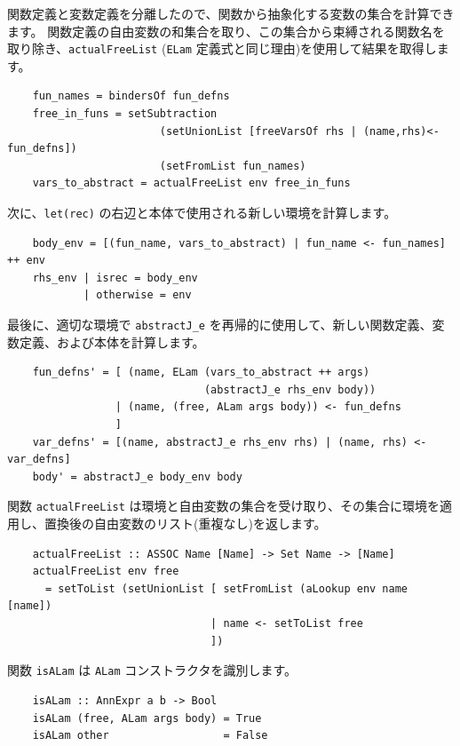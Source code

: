 \documentclass{jbook}
\begin{document}
関数定義と変数定義を分離したので、関数から抽象化する変数の集合を計算できます。
関数定義の自由変数の和集合を取り、この集合から束縛される関数名を取り除き、\texttt{actualFreeList} (\texttt{ELam} 定義式と同じ理由)を使用して結果を取得します。

\begin{verbatim}
	fun_names = bindersOf fun_defns
	free_in_funs = setSubtraction
	                    (setUnionList [freeVarsOf rhs | (name,rhs)<-fun_defns])
	                    (setFromList fun_names)
	vars_to_abstract = actualFreeList env free_in_funs
\end{verbatim}

次に、\texttt{let(rec)} の右辺と本体で使用される新しい環境を計算します。

\begin{verbatim}
	body_env = [(fun_name, vars_to_abstract) | fun_name <- fun_names] ++ env
	rhs_env | isrec = body_env
	        | otherwise = env
\end{verbatim}

最後に、適切な環境で \texttt{abstractJ\_e} を再帰的に使用して、新しい関数定義、変数定義、および本体を計算します。

\begin{verbatim}
	fun_defns' = [ (name, ELam (vars_to_abstract ++ args)
	                           (abstractJ_e rhs_env body))
	             | (name, (free, ALam args body)) <- fun_defns
	             ]
	var_defns' = [(name, abstractJ_e rhs_env rhs) | (name, rhs) <- var_defns]
	body' = abstractJ_e body_env body
\end{verbatim}

関数 \texttt{actualFreeList} は環境と自由変数の集合を受け取り、その集合に環境を適用し、置換後の自由変数のリスト(重複なし)を返します。

\begin{verbatim}
	actualFreeList :: ASSOC Name [Name] -> Set Name -> [Name]
	actualFreeList env free
	  = setToList (setUnionList [ setFromList (aLookup env name [name])
	                            | name <- setToList free
	                            ])
\end{verbatim}

関数 \texttt{isALam} は \texttt{ALam} コンストラクタを識別します。

\begin{verbatim}
	isALam :: AnnExpr a b -> Bool
	isALam (free, ALam args body) = True
	isALam other                  = False
\end{verbatim}
\end{document}
